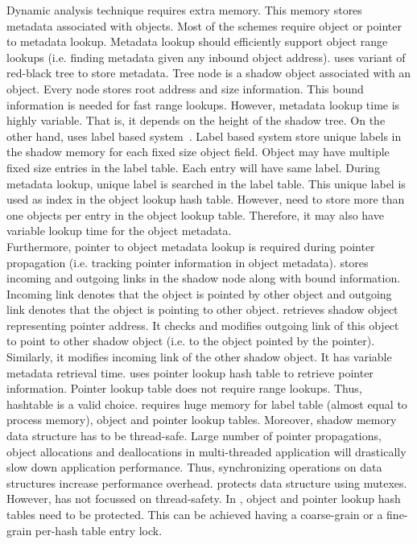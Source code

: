 Dynamic analysis technique requires extra memory. This memory stores metadata associated with objects. Most of the schemes require object or pointer to metadata lookup. Metadata lookup should efficiently support object range lookups (i.e. finding metadata given any inbound object address). \dangnull{} uses variant of red-black tree to store metadata. Tree node is a shadow object associated with an object. Every node stores root address and size information. This bound information is needed for fast range lookups. However, metadata lookup time is highly variable. That is, it depends on the height of the shadow tree. On the other hand, \freesentry{} uses label based system~\cite{younan2010paricheck}. Label based system store unique labels in the shadow memory for each fixed size object field. Object may have multiple fixed size entries in the label table. Each entry will have same label. During metadata lookup, unique label is searched in the label table. This unique label is used as index in the object lookup hash table. However, \freesentry{} need to store more than one objects per entry in the object lookup table. Therefore, it may also have variable lookup time for the object metadata. \\

Furthermore, pointer to object metadata lookup is required during pointer propagation (i.e. tracking pointer information in object metadata). \dangnull{} stores incoming and outgoing links in the shadow node along with bound information. Incoming link denotes that the object is pointed by other object and outgoing link denotes that the object is pointing to other object. \dangnull{} retrieves shadow object representing pointer address. It checks and modifies outgoing link of this object to point to other shadow object (i.e. to the object pointed by the pointer). Similarly, it modifies incoming link of the other shadow object. It has variable metadata retrieval time. \freesentry{} uses pointer lookup hash table to retrieve pointer information. Pointer lookup table does not require range lookups. Thus, hashtable is a valid choice. \freesentry{} requires huge memory for label table (almost equal to process memory), object and pointer lookup tables. Moreover, shadow memory data structure has to be thread-safe. Large number of pointer propagations, object allocations and deallocations in multi-threaded application will drastically slow down application performance. Thus, synchronizing operations on data structures increase performance overhead. \dangnull{} protects data structure using mutexes. However, \freesentry{} has not focussed on thread-safety. In \freesentry{}, object and pointer lookup hash tables need to be protected. This can be achieved having a coarse-grain or a fine-grain per-hash table entry lock.  \\

